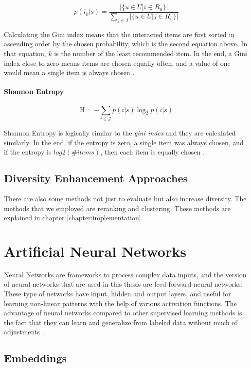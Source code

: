 $$
p ( i_{k} | s ) = \frac { | \{ u \in { U } | i \in R _ { u } \} | } { \sum _ { j \in J } | \{ u \in { U } | j \in R _ { u } \} | }
$$

Calculating the Gini index means that the interacted items are first sorted in ascending order by the chosen probability, which is the second equation above. In that equation, $k$ is the number of the least recommended item. In the end, a Gini index close to zero means items are chosen equally often, and a value of one would mean a single item is always chosen \cite{castells2015novelty}.

\paragraph{Shannon Entropy}

$$
\mathrm { H } = - \sum _ { i \in \mathcal { J } } p ( i | s ) \log _ { 2 } p ( i | s )
$$

Shannon Entropy is logically similar to the \textit{gini index} and they are calculated similarly. In the end, if the entropy is zero, a single item was always chosen, and if the entropy is $log2(\#items)$, then each item is equally chosen \cite{castells2015novelty}.

\subsection{Diversity Enhancement Approaches}

There are also some methods not just to evaluate but also increase diversity. The methods that we employed are reranking and clustering. These methods are explained in chapter \ref{chapter:implementation}.

\section{Artificial Neural Networks}\label{research:nn}

Neural Networks are frameworks to process complex data inputs, and the version of neural networks that are used in this thesis are feed-forward neural networks. These type of networks have input, hidden and output layers, and useful for learning non-linear patterns with the help of various activation functions. The advantage of neural networks compared to other supervised learning methods is the fact that they can learn and generalize from labeled data without much of adjustments \cite{maind2014research}.

\subsection{Embeddings}\label{research:embeddings}


